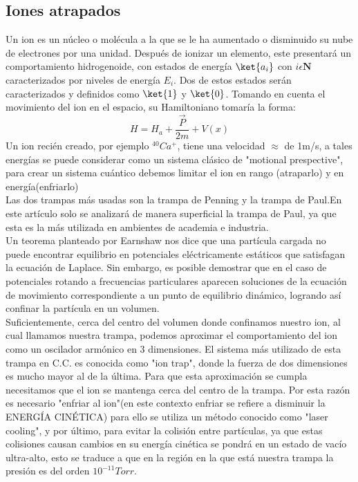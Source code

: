 \subsection{Iones atrapados}\label{sec2}
Un ion es un núcleo o molécula a la que se le ha aumentado o disminuido su nube de electrones por una unidad. Después de ionizar un elemento, este presentará un comportamiento hidrogenoide, con estados de energía 
$\ket{a_{i}}$ con $i\epsilon\mathbf{N}$ caracterizados por niveles de energía $E_{i}$. Dos de estos estados serán caracterizados y definidos como $\ket{1}$ y $\ket{0}$.
Tomando en cuenta el movimiento del ion en el espacio, su Hamiltoniano tomaría la forma:
\begin{equation}
    H=H_{a}+\frac{\Vec{P}}{2m}+V(x)
\end{equation}
Un ion recién creado, por ejemplo $^{40}Ca^{+}$, tiene una velocidad $\approx$ de 1m/s, a tales energías se puede considerar como un sistema clásico de "motional prespective", para crear un sistema cuántico debemos limitar el ion en rango (atraparlo) y en energía(enfriarlo)\\
Las dos trampas más usadas son la trampa de Penning y la trampa de Paul.En este artículo solo se analizará de manera superficial la trampa de Paul, ya que esta es la más utilizada en ambientes de academia e industria.\\
Un teorema planteado por Earnshaw nos dice que una partícula cargada no puede encontrar equilibrio en potenciales eléctricamente estáticos que satisfagan la ecuación de Laplace. Sin embargo, es posible demostrar que en el caso de potenciales rotando a frecuencias particulares aparecen soluciones de la ecuación de movimiento correspondiente a un punto de equilibrio dinámico, logrando así confinar la partícula en un volumen.\\
Suficientemente, cerca del centro del volumen donde confinamos nuestro ion, al cual llamamos nuestra trampa, podemos aproximar el comportamiento del ion como un oscilador armónico en 3 dimensiones. El sistema más utilizado de esta trampa en C.C. es conocida como "ion trap", donde la fuerza de dos dimensiones es mucho mayor al de la última. Para que esta aproximación se cumpla necesitamos que el ion se mantenga cerca del centro de la trampa. Por esta razón es necesario "enfriar al ion"(en este contexto enfriar se refiere a disminuir la ENERGÍA CINÉTICA) para ello se utiliza un método conocido como "laser cooling", y por último, para evitar la colisión entre partículas, ya que estas colisiones causan cambios en su energía cinética se pondrá en un estado de vacío ultra-alto, esto se traduce a que en la región en la que está nuestra trampa la presión es del orden $10^{-11}Torr$.
